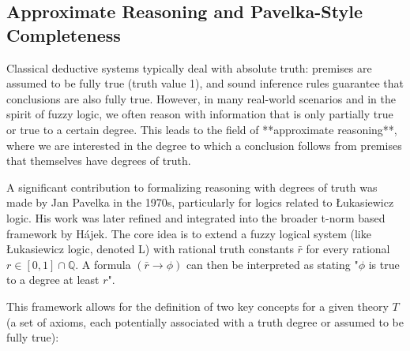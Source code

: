 







\subsection{Approximate Reasoning and Pavelka-Style Completeness}

Classical deductive systems typically deal with absolute truth: premises are assumed to be fully true (truth value 1), and sound inference rules guarantee that conclusions are also fully true. However, in many real-world scenarios and in the spirit of fuzzy logic, we often reason with information that is only partially true or true to a certain degree. This leads to the field of **approximate reasoning**, where we are interested in the degree to which a conclusion follows from premises that themselves have degrees of truth.

A significant contribution to formalizing reasoning with degrees of truth was made by Jan Pavelka in the 1970s, particularly for logics related to Łukasiewicz logic. His work was later refined and integrated into the broader t-norm based framework by Hájek. The core idea is to extend a fuzzy logical system (like Łukasiewicz logic, denoted L) with rational truth constants $\bar{r}$ for every rational $r \in [0,1] \cap \mathbb{Q}$. A formula $(\bar{r} \rightarrow \phi)$ can then be interpreted as stating "$\phi$ is true to a degree at least $r$".

This framework allows for the definition of two key concepts for a given theory $T$ (a set of axioms, each potentially associated with a truth degree or assumed to be fully true):

